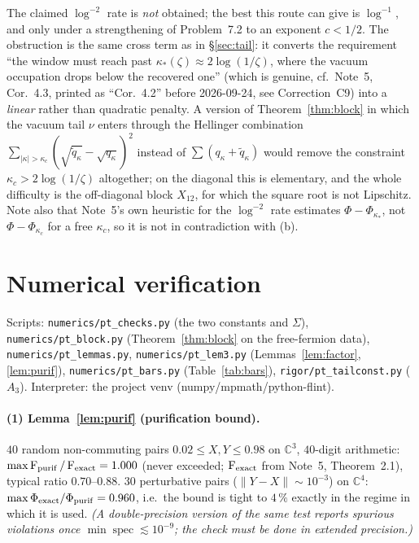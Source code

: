 \documentclass[11pt]{article}
\begin{document}
\begin{verdictgap}
The claimed $\log^{-2}$ rate is \emph{not} obtained; the best this route can give is $\log^{-1}$, and
only under a strengthening of Problem~7.2 to an exponent $c<1/2$.  The obstruction is the same cross
term as in \S\ref{sec:tail}: it converts the requirement ``the window must reach past
$\kappa_*(\zeta)\approx2\log(1/\zeta)$, where the vacuum occupation drops below the recovered one''
(which is genuine, cf.\ Note~5, Cor.~4.3, printed as ``Cor.~4.2'' before 2026-09-24, see Correction~C9) into a \emph{linear} rather than quadratic penalty.  A
version of Theorem~\ref{thm:block} in which the vacuum tail $\nu$ enters through the Hellinger
combination $\sum_{|\kappa|>\kappa_c}(\sqrt{\widetilde q_\kappa}-\sqrt{q_\kappa})^2$ instead of
$\sum(q_\kappa+\widetilde q_\kappa)$ would remove the constraint $\kappa_c>2\log(1/\zeta)$ altogether;
on the diagonal this is elementary, and the whole difficulty is the off-diagonal block $X_{12}$, for
which the square root is not Lipschitz.  Note also that Note~5's own heuristic for the $\log^{-2}$
rate estimates $\Phi-\Phi_{\kappa_*}$, not $\Phi-\Phi_{\kappa_c}$ for a free $\kappa_c$, so it is not
in contradiction with (b).
\end{verdictgap}
\section{Numerical verification}\label{sec:num}

Scripts: \texttt{numerics/pt\_checks.py} (the two constants and $\Sigma$),
\texttt{numerics/pt\_block.py} (Theorem~\ref{thm:block} on the free-fermion data),
\texttt{numerics/pt\_lemmas.py}, \texttt{numerics/pt\_lem3.py} (Lemmas~\ref{lem:factor},
\ref{lem:purif}), \texttt{numerics/pt\_bars.py} (Table~\ref{tab:bars}),
\texttt{rigor/pt\_tailconst.py} ($A_3$).  Interpreter:
the project venv (numpy/mpmath/python-flint).

\paragraph{(1) Lemma~\ref{lem:purif} (purification bound).}  $40$ random non-commuting pairs
$0.02\le X,Y\le0.98$ on $\mathbb C^3$, $40$-digit arithmetic: $\max\operatorname{F}_{\rm purif}/\operatorname{F}_{\rm exact}
=1.000$ (never exceeded; $\operatorname{F}_{\rm exact}$ from Note~5, Theorem~2.1), typical ratio $0.70$--$0.88$.
$30$ perturbative pairs ($\|Y-X\|\sim10^{-3}$) on $\mathbb C^4$:
$\max\Phi_{\rm exact}/\Phi_{\rm purif}=0.960$, i.e.\ the bound is tight to $4\,\%$ exactly in the
regime in which it is used.  \emph{(A double-precision version of the same test reports spurious
violations once $\min\operatorname{spec}\lesssim10^{-9}$; the check must be done in extended
precision.)}
\end{document}
